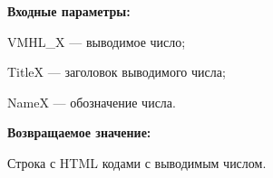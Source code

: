 \textbf{Входные параметры:}

VMHL\_X --- выводимое число;
 
    TitleX --- заголовок выводимого числа;
 
    NameX --- обозначение числа.

\textbf{Возвращаемое значение:}

Строка с HTML кодами с выводимым числом.